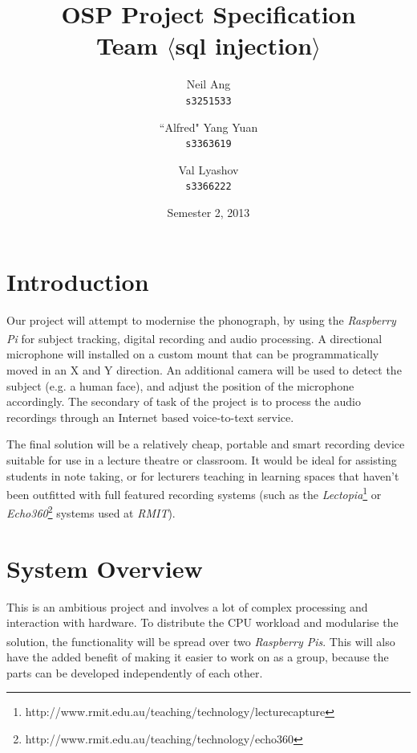 \documentclass[11pt,a4paper,titlepage]{report}
\title{OSP Project Specification \\ Team $\langle$sql injection$\rangle$}
\author{
  Neil Ang\\
  \texttt{s3251533}
  \and
  ``Alfred" Yang Yuan\\
  \texttt{s3363619}
  \and
  Val Lyashov\\
  \texttt{s3366222}
}
\date{Semester 2, 2013}
\newcommand{\rpi}{\textit{Raspberry Pi\textsuperscript{\textregistered}}}
\newcommand{\rpis}{\textit{Raspberry Pi\textsuperscript{\textregistered}s}}
\begin{document}
\maketitle

\pagebreak
\tableofcontents
\thispagestyle{empty}
\pagebreak

\section{Introduction}

Our project will attempt to modernise the phonograph, by using the \rpi\xspace for subject tracking, digital recording and audio processing. A directional microphone will installed on a custom mount that can be programmatically moved in an X and Y direction. An additional camera will be used to detect the subject (e.g. a human face), and adjust the position of the microphone accordingly. The secondary of task of the project is to process the audio recordings through an Internet based voice-to-text service.

The final solution will be a relatively cheap, portable and smart recording device suitable for use in a lecture theatre or classroom. It would be ideal for assisting students in note taking, or for lecturers teaching in learning spaces that haven't been outfitted with full featured recording systems (such as the \textit{Lectopia}\footnote{http://www.rmit.edu.au/teaching/technology/lecturecapture} or \textit{Echo360}\footnote{http://www.rmit.edu.au/teaching/technology/echo360} systems used at \textit{RMIT}).


\section{System Overview}

This is an ambitious project and involves a lot of complex processing and interaction with hardware. To distribute the CPU workload and modularise the solution, the functionality will be spread over two \rpis. This will also have the added benefit of making it easier to work on as a group, because the parts can be developed independently of each other.
\end{document}
